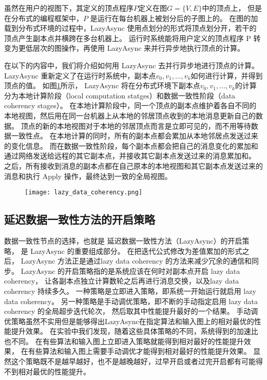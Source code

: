 虽然在用户的视图下，其定义的顶点程序$P$定义在图$G = \{V,E\}$中的顶点上，
但是在分布式的编程框架中，$P$ 是运行在每台机器上被划分后的子图上的。
在图的加载到分布式环境的过程中，LazyAsync 使用点划分的形式将顶点划分开，若干的顶点产生副本点并横跨在多台机器上。
运行时系统能将用户定义的顶点程序 P 转变为更低层次的图操作，再使用 LazyAsync 来并行异步地执行顶点的计算。

在以下的内容中，我们将介绍如何用 LazyAsync 去并行异步地进行顶点的计算。
LazyAsync 重新定义了在运行时系统中，副本点$v_0 , v_1 , ... , v_k$如何进行计算，并得到顶点的值。
如图\ref{fig:lazy_data_coherency}所示，
LazyAsync 将在分布式环境下副本点$v_0 , v_1 , ... , v_k$的计算分为本地计算阶段（local computation statges）和数据一致性阶段（data coherency stages）。
在本地计算阶段中，同一个顶点的副本点维护着各自不同的本地视图，然后用在同一台机器上从本地的邻居顶点收到的本地消息更新自己的数据。
顶点的新的本地视图对于本地的邻居顶点而言是立即可见的，而不用等待数据一致性点。
在本地计算的同时，所有的副本点都会累加从本地邻居点发送过来的变化信息。
而在数据一致性阶段，每个副本点都会把自己的消息变化的累加和通过网络发送给远程的其它副本点，并接收其它副本点发送过来的消息累加和。
之后，所有接收到消息的副本点都在自己原本的本地视图和其它副本点发送过来的消息和执行 Apply 操作，最终达到一致的全局视图。
\begin{figure}[!htbp]
\centering
\texttt{[image: lazy\_data\_coherency.png]}
\label{fig:lazy_data_coherency}
\end{figure}

\subsection{延迟数据一致性方法的开启策略}

数据一致性节点的选择，也就是 延迟数据一致性方法（LazyAsync）的开启策略， 是 LazyAsync 的重要组成部分。
在把迭代公式修改为差值累加的形式之后， LazyAsync 方法正是通过lazy data coherency 的方法来减少冗余的通信和同步。
LazyAsync 的开启策略指的是系统应该在何时对副本点开启 lazy data coherency，
让各副本点独立计算数轮之后再进行消息交换，以及lazy data coherency 持续多久。
一种策略是立即进入策略，即系统一开始运行就启用 lazy data coherency。
另一种策略是手动调优策略，即不断的手动指定启用 lazy data coherency 的全局超步迭代轮次，
然后取其中性能提升最好的一个结果。
手动调优策略虽然不实用但是能够得出LazyAsync在指定算法和输入图上的相对最优的性能提升效果。
在实验中我们发现，随着这些具体策略的不同，系统得到的加速比也不同。
在有些算法和输入图上立即进入策略就能得到相对最好的性能提升效果，
在有些算法和输入图上需要手动调优才能得到相对最好的性能提升效果。
显然这个策略既不是越早越好，也不是越晚越好，过早开启或者过完开启都有可能得不到相对最优的性能提升。

